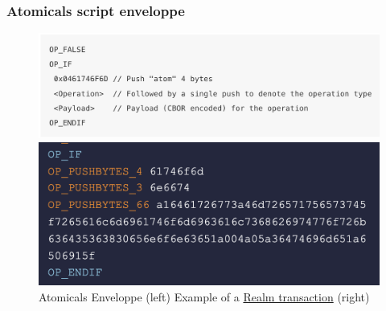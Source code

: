\documentclass[hyperref={colorlinks=true}]{beamer}
\begin{document}
\begin{frame}
\frametitle{Atomicals script enveloppe}

\begin{center}

\begin{figure}
  \label{atom}
  \centering
  \begin{minipage}[b]{0.5\textwidth}
    \centering
    \includegraphics[width=\textwidth]{./assets/atom_enveloppe.png}
  \end{minipage}
  \hfill
  \begin{minipage}[b]{0.45\textwidth}
    \centering
    \includegraphics[width=\textwidth]{./assets/atom_tx.png}
  \end{minipage}
  \caption{Atomicals Enveloppe (left) Example of a \href{https://mempool.space/tx/27701d793710cd244a253922e6ef22121d8c78c0a34f2b7b1188cba6f05d4342}{Realm transaction} (right)}

\end{figure}

\end{center}

\end{frame}


\end{document}
